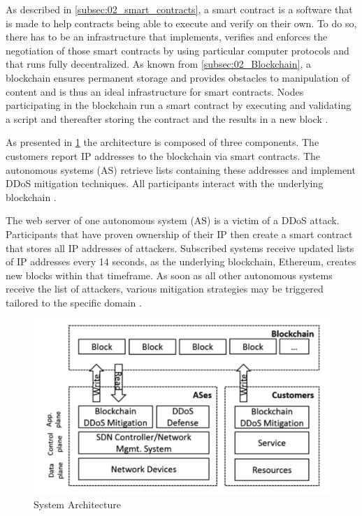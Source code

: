As described in \ref{subsec:02_smart_contracts}, a smart contract is a software that is made to help contracts being able to execute and verify on their own. To do so, there has to be an infrastructure that implements, verifies and enforces the negotiation of those smart contracts by using particular computer protocols and that runs fully decentralized. As known from \ref{subsec:02_Blockchain}, a blockchain ensures permanent storage and provides obstacles to manipulation of content and is thus an ideal infrastructure for smart contracts. Nodes participating in the blockchain run a smart contract by executing and validating a script and thereafter storing the contract and the results in a new block \cite{Rodrigues2017}.

As presented in \ref{system_architecture} the architecture is composed of three components. The customers report IP addresses to the blockchain via smart contracts. The autonomous systems (AS) retrieve lists containing these addresses and implement DDoS mitigation techniques. All participants interact with the underlying blockchain \cite{Rodrigues2017}.

The web server of one autonomous system (AS) is a victim of a DDoS attack. Participants that have proven ownership of their IP then create a smart contract that stores all IP addresses of attackers. Subscribed systems receive updated lists of IP addresses every 14 seconds, as the underlying blockchain, Ethereum, creates new blocks within that timeframe. As soon as all other autonomous systems receive the list of attackers, various mitigation strategies may be triggered tailored to the specific domain \cite{Rodrigues2017}.
\begin{figure}[ht]
  \begin{center}
    \includegraphics[scale=0.6]{Talk7/img/ddos/collaborative_ddos_mitigation_system_architecture}
  \end{center}
  \caption{System Architecture}
  \label{system_architecture}
\end{figure}

